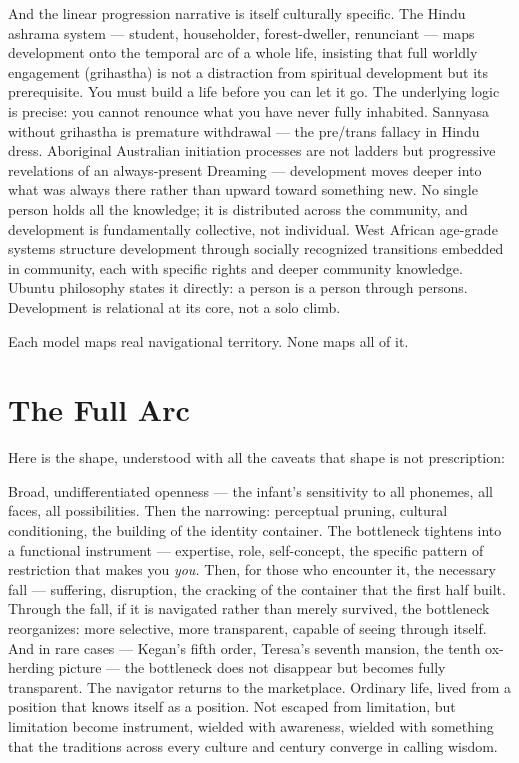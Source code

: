 And the linear progression narrative is itself culturally specific. The Hindu ashrama system — student, householder, forest-dweller, renunciant — maps development onto the temporal arc of a whole life, insisting that full worldly engagement (grihastha) is not a distraction from spiritual development but its prerequisite. You must build a life before you can let it go. The underlying logic is precise: you cannot renounce what you have never fully inhabited. Sannyasa without grihastha is premature withdrawal — the pre/trans fallacy in Hindu dress. Aboriginal Australian initiation processes are not ladders but progressive revelations of an always-present Dreaming — development moves deeper into what was always there rather than upward toward something new. No single person holds all the knowledge; it is distributed across the community, and development is fundamentally collective, not individual. West African age-grade systems structure development through socially recognized transitions embedded in community, each with specific rights and deeper community knowledge. Ubuntu philosophy states it directly: a person is a person through persons. Development is relational at its core, not a solo climb.


Each model maps real navigational territory. None maps all of it.


\section*{The Full Arc}


Here is the shape, understood with all the caveats that shape is not prescription:


Broad, undifferentiated openness — the infant's sensitivity to all phonemes, all faces, all possibilities. Then the narrowing: perceptual pruning, cultural conditioning, the building of the identity container. The bottleneck tightens into a functional instrument — expertise, role, self-concept, the specific pattern of restriction that makes you \textit{you.} Then, for those who encounter it, the necessary fall — suffering, disruption, the cracking of the container that the first half built. Through the fall, if it is navigated rather than merely survived, the bottleneck reorganizes: more selective, more transparent, capable of seeing through itself. And in rare cases — Kegan's fifth order, Teresa's seventh mansion, the tenth ox-herding picture — the bottleneck does not disappear but becomes fully transparent. The navigator returns to the marketplace. Ordinary life, lived from a position that knows itself as a position. Not escaped from limitation, but limitation become instrument, wielded with awareness, wielded with something that the traditions across every culture and century converge in calling wisdom.


